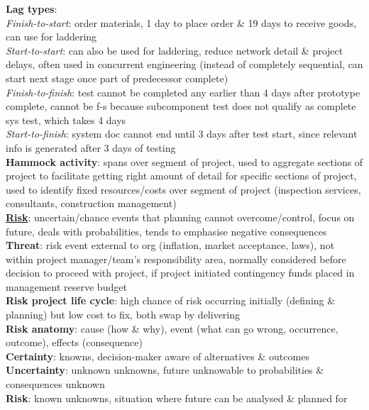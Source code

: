 \documentclass[a4paper]{article}
\begin{document}
\begin{multicols}{2}
        \textbf{Lag types}:\\
        \textit{Finish-to-start}: order materials, 1 day to place order \& 19 days to receive goods, can use for laddering\\
        \textit{Start-to-start}: can also be used for laddering, reduce network detail \& project delays, often used in concurrent engineering (instead of completely sequential, can start next stage once part of predecessor complete)\\
        \textit{Finish-to-finish}: test cannot be completed any earlier than 4 days after prototype complete, cannot be f-s because subcomponent test does not qualify as complete sys test, which takes 4 days\\
        \textit{Start-to-finish}: system doc cannot end until 3 days after test start, since relevant info is generated after 3 days of testing\\
        \textbf{Hammock activity}: spans over segment of project, used to aggregate sections of project to facilitate getting right amount of detail for specific sections of project, used to identify fixed resources/costs over segment of project (inspection services, consultants, construction management)\\
        \underline{\textbf{Risk}}: uncertain/chance events that planning cannot overcome/control, focus on future, deals with probabilities, tends to emphasise negative consequences\\
        \textbf{Threat}: risk event external to org (inflation, market acceptance, laws), not within project manager/team's responsibility area, normally considered before decision to proceed with project, if project initiated contingency funds placed in management reserve budget\\
        \textbf{Risk project life cycle}: high chance of risk occurring initially (defining \& planning) but low cost to fix, both swap by delivering\\
        \textbf{Risk anatomy}: cause (how \& why), event (what can go wrong, occurrence, outcome), effects (consequence)\\
        \textbf{Certainty}: knowns, decision-maker aware of alternatives \& outcomes\\
        \textbf{Uncertainty}: unknown unknowns, future unknowable to probabilities \& consequences unknown\\
        \textbf{Risk}: known unknowns, situation where future can be analysed \& planned for\\

\end{multicols}
\end{document}
